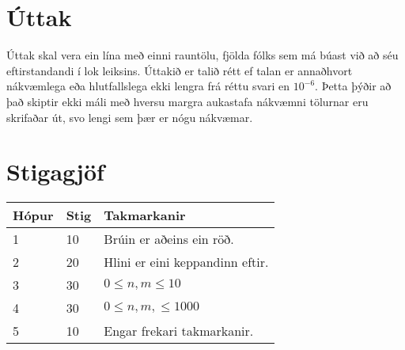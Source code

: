 \section*{Úttak}
Úttak skal vera ein lína með einni rauntölu, fjölda fólks sem má búast við að séu eftirstandandi
í lok leiksins.
Úttakið er talið rétt ef talan er annaðhvort nákvæmlega eða hlutfallslega 
ekki lengra frá réttu svari en $10^{-6}$.
Þetta þýðir að það skiptir ekki máli með hversu margra aukastafa nákvæmni 
tölurnar eru skrifaðar út, svo lengi sem þær er nógu nákvæmar.


\section*{Stigagjöf}
\begin{tabular}{|l|l|l|}
\hline
Hópur & Stig & Takmarkanir \\ \hline
1     & 10   & Brúin er aðeins ein röð.\\ \hline
2     & 20   & Hlini er eini keppandinn eftir.\\ \hline
3     & 30   & $0 \leq n, m \leq 10$ \\ \hline
4     & 30   & $0 \leq n, m, \leq 1000$ \\ \hline
5     & 10   & Engar frekari takmarkanir. \\ \hline
\end{tabular}

